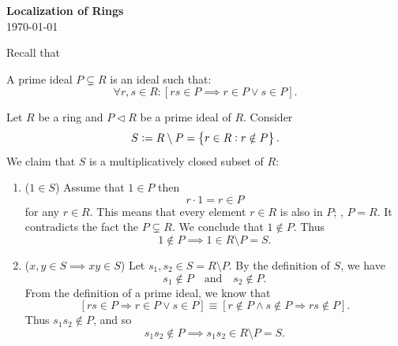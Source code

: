 \documentclass[11pt,openany]{article}
\begin{document}
\begin{center}
\huge\textbf{Localization of Rings}\\
\vspace{0.5em}
\vspace{0.5em}
\normalsize{\today}\\
\end{center}
	
\begin{example*} Recall that
	\begin{tcolorbox}[colback=white]
			A prime ideal $P\subsetneq R$ is an ideal such that: \[
		\forall r,s\in R:\left[rs\in P\implies r\in P\lor s\in P\right].
		\]
	\end{tcolorbox}
	Let $R$ be a ring and $P\lhd R$ be a prime ideal of $R$. Consider \[
	S:=R\setminus P=\set{r\in R:r\notin P}.
	\] We claim that $S$ is a multiplicatively closed subset of $R$: \begin{enumerate}
		\item ($1\in S$) Assume that $1\in P$ then \[
		r\cdot 1=r\in P
		\] for any $r\in R$. This means that every element $r\in R$ is also in $P$; \ie, $P=R$. It contradicts the fact the $P\subsetneq R$. We conclude that $1\notin P$. Thus \[
		1\notin P\implies 1\in R\setminus P=S.
		\]
		\item ($x,y\in S\implies xy\in S$) Let $s_1,s_2\in S=R\setminus P$. By the definition of $S$, we have \[
		s_1\notin P\quad\text{and}\quad s_2\notin P.
		\] From the definition of a prime ideal, we know that \[
		[rs\in P\Rightarrow r\in P\lor s\in P]\equiv[r\notin P\land s\notin P\Rightarrow rs\notin P].
		\] Thus $s_1s_2\notin P$, and so \[
		s_1s_2\notin P\implies s_1s_2\in R\setminus P=S.
		\]
	\end{enumerate}
\end{example*}
\end{document}
